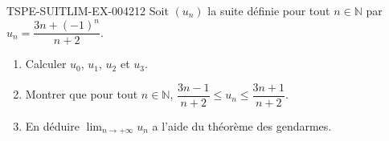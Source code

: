 \begin{exercice}{TSPE-SUITLIM-EX-004}{2}{12}
Soit $(u_n)$ la suite définie pour tout $n \in \mathbb{N}$ par $u_n = \dfrac{3n + (-1)^n}{n + 2}$.
\begin{enumerate}
  \item Calculer $u_0$, $u_1$, $u_2$ et $u_3$.
  \item Montrer que pour tout $n \in \mathbb{N}$, $\dfrac{3n - 1}{n + 2} \leq u_n \leq \dfrac{3n + 1}{n + 2}$.
  \item En déduire $\lim_{n \to +\infty} u_n$ a l'aide du théorème des gendarmes.
\end{enumerate}
\end{exercice}
